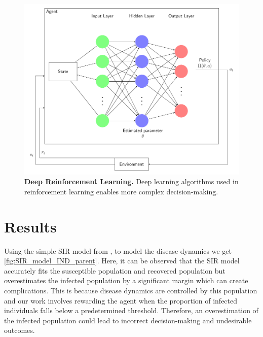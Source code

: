 \documentclass[tikz,fleqn,12pt]{wlscirep}
\begin{document}
\begin{figure}[htbp!]
  \centering
  \includegraphics[width=0.7\linewidth]{images/sir_arch.pdf}
  \caption{\textbf{Deep Reinforcement Learning.} Deep learning algorithms used in reinforcement learning enables more complex decision-making.}
  \label{fig:sir_arch}
\end{figure}


\section{Results}
Using the simple SIR model from ,  to model the disease dynamics we get \cref{fig:SIR_model_IND_parent}. Here, it can be observed that the SIR model accurately fits the susceptible population and recovered population but overestimates the infected population by a significant margin which can create complications. This is because disease dynamics are controlled by this population and our work involves rewarding the agent when the proportion of infected individuals falls below a predetermined threshold. Therefore, an overestimation of the infected population could lead to incorrect decision-making and undesirable outcomes.
\end{document}
